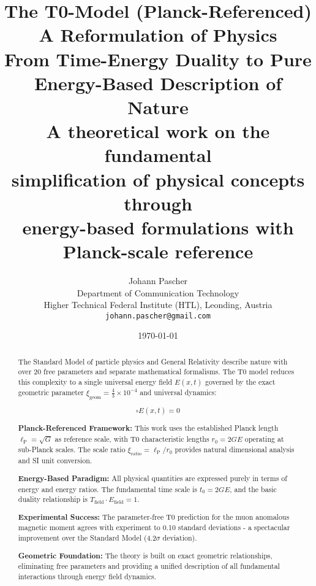 \documentclass[12pt,a4paper]{report}
\title{
	{\Huge The T0-Model (Planck-Referenced)}\\
	{\LARGE A Reformulation of Physics}\\
	{\Large From Time-Energy Duality to Pure\\Energy-Based Description of Nature}\\
	\vspace{1cm}
	{\large A theoretical work on the fundamental\\simplification of physical concepts through\\energy-based formulations with Planck-scale reference}
}
\author{
	{\Large Johann Pascher}\\
	Department of Communication Technology\\
	Higher Technical Federal Institute (HTL), Leonding, Austria\\
	\texttt{johann.pascher@gmail.com}
}
\date{\today}
\newcommand{\Efield}{E(x,t)}              %
\newcommand{\lP}{\ell_{\text{P}}}         %
\newcommand{\rzero}{r_0}                  %
\newcommand{\tzero}{t_0}                  %
\newcommand{\xigeom}{\xi_{\text{geom}}}   %
\newcommand{\xirat}{\xi_{\text{ratio}}}   %
\begin{document}
	
	\maketitle
	
	\begin{abstract}
		The Standard Model of particle physics and General Relativity describe nature with over 20 free parameters and separate mathematical formalisms. The T0 model reduces this complexity to a single universal energy field $\Efield$ governed by the exact geometric parameter $\xigeom = \frac{4}{3} \times 10^{-4}$ and universal dynamics:
		
		\begin{equation}
			\square \Efield = 0
		\end{equation}
		
		\textbf{Planck-Referenced Framework:} This work uses the established Planck length $\lP = \sqrt{G}$ as reference scale, with T0 characteristic lengths $\rzero = 2GE$ operating at sub-Planck scales. The scale ratio $\xirat = \lP/\rzero$ provides natural dimensional analysis and SI unit conversion.
		
		\textbf{Energy-Based Paradigm:} All physical quantities are expressed purely in terms of energy and energy ratios. The fundamental time scale is $\tzero = 2GE$, and the basic duality relationship is $T_{\text{field}} \cdot E_{\text{field}} = 1$.
		
		\textbf{Experimental Success:} The parameter-free T0 prediction for the muon anomalous magnetic moment agrees with experiment to 0.10 standard deviations - a spectacular improvement over the Standard Model (4.2$\sigma$ deviation).
		
		\textbf{Geometric Foundation:} The theory is built on exact geometric relationships, eliminating free parameters and providing a unified description of all fundamental interactions through energy field dynamics.
	\end{abstract}
	
	\tableofcontents
	
	
\end{document}
